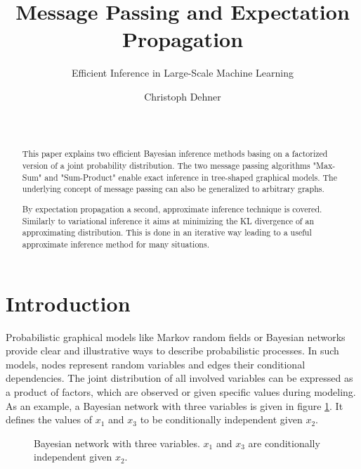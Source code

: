 \documentclass{sigkdd}
\title{Message Passing and Expectation Propagation}
\subtitle{Efficient Inference in Large-Scale Machine Learning}
\author{
\alignauthor Christoph Dehner \\
\affaddr{Department of Informatics}\\
\affaddr{Technische Universit\"at M\"unchen}\\
\email{dehner@in.tum.de}
}
\begin{document}
\maketitle

\begin{abstract}
This paper explains two efficient Bayesian inference methods basing on a factorized version of a joint probability distribution. The two message passing algorithms "Max-Sum" and "Sum-Product" enable exact inference in tree-shaped graphical models. The underlying concept of message passing can also be generalized to arbitrary graphs.

By expectation propagation a second, approximate inference technique is covered. Similarly to variational inference it aims at minimizing the KL divergence of an approximating distribution. This is done in an iterative way leading to a useful approximate inference method for many situations.
\end{abstract}

\section{Introduction}
Probabilistic graphical models like Markov random fields or Bayesian networks provide clear and illustrative ways to describe probabilistic processes. In such models, nodes represent random variables and edges their conditional dependencies. The joint distribution of all involved variables can be expressed as a product of factors, which are observed or given specific values during modeling. As an example, a Bayesian network with three variables is given in figure \ref{fig:BN}. It defines the values of $x_1$ and $x_3$ to be conditionally independent given $x_2$.
\begin{figure}[h]
	\centering
	\caption{Bayesian network with three variables. $x_1$ and $x_3$ are conditionally independent given $x_2$.}\label{fig:BN}
\end{figure}
\end{document}
